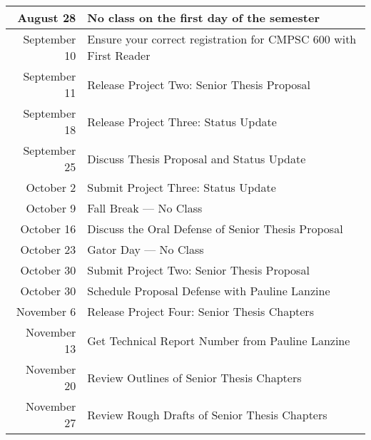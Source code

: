 \documentclass[11pt]{article}
\begin{document}
\begin{center}
\begin{longtable}{r|l}

\hline

August 28 & No class on the first day of the semester \\

\hline

September 10 & Ensure your correct registration for CMPSC 600 with First Reader            \\
September 11 & Release Project Two: Senior Thesis Proposal         \\
September 18 & Release Project Three: Status Update \\
September 25 & Discuss Thesis Proposal and Status Update \\

\hline

October 2  & Submit Project Three: Status Update                \\
October 9 & Fall Break --- No Class                            \\
October 16 & Discuss the Oral Defense of Senior Thesis Proposal \\
October 23 & Gator Day --- No Class                             \\
October 30 & Submit Project Two: Senior Thesis Proposal         \\
October 30 & Schedule Proposal Defense with Pauline Lanzine     \\

\hline

November 6  & Release Project Four: Senior Thesis Chapters     \\
November 13 & Get Technical Report Number from Pauline Lanzine \\
November 20 & Review Outlines of Senior Thesis Chapters        \\
November 27 & Review Rough Drafts of Senior Thesis Chapters    \\

\hline


\end{longtable}
\end{center}
\end{document}
